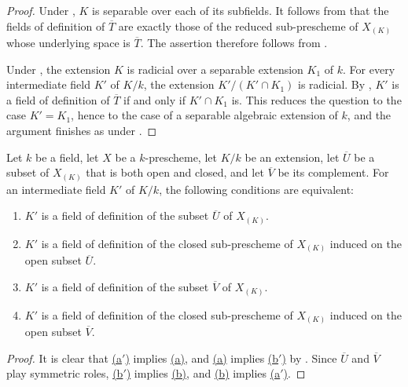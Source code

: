 \begin{proof}
Under , $K$ is separable over each of its
subfields.
It follows from  that the fields of definition of
$\overline T$ are exactly those of the reduced sub-prescheme of
$X_{(K)}$ whose underlying space is $\overline T$.
The assertion therefore follows from .

Under , the extension $K$ is radicial over a
separable extension $K_1$ of $k$.
For every intermediate field $K'$ of $K/k$, the extension
$K'/(K'\cap K_1)$ is radicial.
By , $K'$ is a field of definition of
$\overline T$ if and only if $K'\cap K_1$ is.
This reduces the question to the case $K'=K_1$, hence to the case of
a separable algebraic extension of $k$, and the argument finishes as
under .
\end{proof}

\begin{proposition}[4.9.6]
\label{IV.4.9.6}
Let $k$ be a field, let $X$ be a $k$-prescheme, let $K/k$ be an
extension, let $\overline U$ be a subset of $X_{(K)}$ that is both
open and closed, and let $\overline V$ be its complement.
For an intermediate field $K'$ of $K/k$, the following conditions
are equivalent:
\begin{enumerate}
\item[\rm(a)]
\label{IV.4.9.6.a}
$K'$ is a field of definition of the subset $\overline U$ of
$X_{(K)}$.
\item[\rm(a$'$)]
\label{IV.4.9.6.aprime}
$K'$ is a field of definition of the closed sub-prescheme of
$X_{(K)}$ induced on the open subset $\overline U$.
\item[\rm(b)]
\label{IV.4.9.6.b}
$K'$ is a field of definition of the subset $\overline V$ of
$X_{(K)}$.
\item[\rm(b$'$)]
\label{IV.4.9.6.bprime}
$K'$ is a field of definition of the closed sub-prescheme of
$X_{(K)}$ induced on the open subset $\overline V$.
\end{enumerate}
\end{proposition}

\begin{proof}
It is clear that
\hyperref[IV.4.9.6.aprime]{(a$'$)} implies
\hyperref[IV.4.9.6.a]{(a)}, and
\hyperref[IV.4.9.6.a]{(a)} implies
\hyperref[IV.4.9.6.bprime]{(b$'$)} by .
Since $\overline U$ and $\overline V$ play symmetric roles,
\hyperref[IV.4.9.6.bprime]{(b$'$)} implies
\hyperref[IV.4.9.6.b]{(b)}, and
\hyperref[IV.4.9.6.b]{(b)} implies
\hyperref[IV.4.9.6.aprime]{(a$'$)}.
\end{proof}

